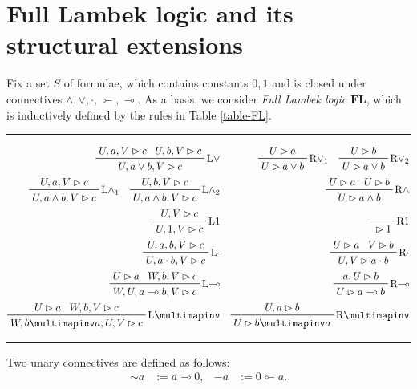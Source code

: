 \documentclass[runningheads]{llncs}
\newcommand{\FL}{\mathbf{FL}}
\begin{document}
\section{Full Lambek logic and its structural extensions}

Fix a set $S$ of formulae, which contains constants $0,1$ and is closed under connectives $\wedge,\vee,\cdot,\multimapinv,\multimap$.
As a basis, we consider \emph{Full Lambek logic} $\FL$, which is inductively defined by the rules in Table \ref{table-FL}.

\begin{table}
	\rule{\linewidth}{0.4pt}
	\begin{align*}
		\prftree[r]{\textnormal{L$\vee$}}{U,a,V\rhd c}{U,b,V\rhd c}{U,a\vee b,V\rhd c}
		&&
		\prftree[r]{\textnormal{R$\vee_1$}}{U\rhd a}{U\rhd a\vee b}
		\quad
		\prftree[r]{\textnormal{R$\vee_2$}}{U\rhd b}{U\rhd a\vee b}
		\\
		\prftree[r]{\textnormal{L$\wedge_1$}}{U,a,V\rhd c}{U,a\wedge b,V\rhd c}
		\quad
		\prftree[r]{\textnormal{L$\wedge_2$}}{U,b,V\rhd c}{U,a\wedge b,V\rhd c}
		&&
		\prftree[r]{\textnormal{R$\wedge$}}{U\rhd a}{U\rhd b}{U\rhd a\wedge b}
		\\
		\prftree[r]{\textnormal{L$1$}}{U,V\rhd c}{U,1,V\rhd c}
		&&
		\prftree[r]{\textnormal{R$1$}}{{}\rhd 1}
		\\
		\prftree[r]{\textnormal{L$\cdot$}}{U,a,b,V\rhd c}{U,a\cdot b,V\rhd c}
		&&
		\prftree[r]{\textnormal{R$\cdot$}}{U\rhd a}{V\rhd b}{U,V\rhd a\cdot b}
		\\
		\prftree[r]{\textnormal{L$\multimap$}}{U\rhd a}{W,b,V\rhd c}{W,U,a\multimap b,V\rhd c}
		&&
		\prftree[r]{\textnormal{R$\multimap$}}{a,U\rhd b}{U\rhd a\multimap b}
		\\
		\prftree[r]{\textnormal{L$\multimapinv$}}{U\rhd a}{W,b,V\rhd c}{W,b\multimapinv a,U,V\rhd c}
		&&
		\prftree[r]{\textnormal{R$\multimapinv$}}{U,a\rhd b}{U\rhd b\multimapinv a}
	\end{align*}
	\rule{\linewidth}{0.4pt}
	\caption{The rules that generate $\FL$, adapted from \cite[\S 2.1]{ResLat}.
    To sometimes have a slicker notation, we subsume under L$\wedge$ and R$\vee$ the two left rules L$\wedge_1$ and L$\wedge_2$ and the two right rules R$\vee_1$ and R$\vee_2$,  respectively.}\label{table-FL}
\end{table}

Two unary connectives are defined as follows:
\begin{align*}
	{\sim} a &:= a\multimap 0,
	&
	-a &:= 0\multimapinv a.
\end{align*}
\end{document}
